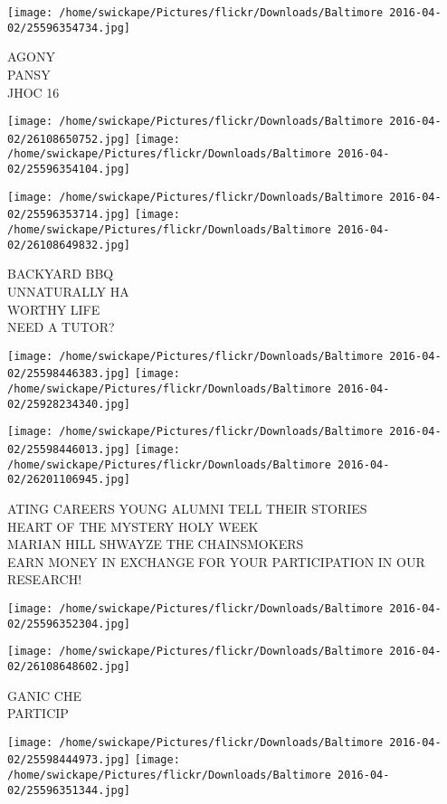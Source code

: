 \documentclass[10pt,letterpaper]{article}
\begin{document}
\vspace{0.25in}
\texttt{[image: /home/swickape/Pictures/flickr/Downloads/Baltimore 2016-04-02/25596354734.jpg]}

AGONY\\
PANSY\\
JHOC 16
\pagebreak

\texttt{[image: /home/swickape/Pictures/flickr/Downloads/Baltimore 2016-04-02/26108650752.jpg]}
\texttt{[image: /home/swickape/Pictures/flickr/Downloads/Baltimore 2016-04-02/25596354104.jpg]}

\texttt{[image: /home/swickape/Pictures/flickr/Downloads/Baltimore 2016-04-02/25596353714.jpg]}
\texttt{[image: /home/swickape/Pictures/flickr/Downloads/Baltimore 2016-04-02/26108649832.jpg]}

BACKYARD BBQ\\
UNNATURALLY HA\\
WORTHY LIFE\\
NEED A TUTOR?
\pagebreak

\texttt{[image: /home/swickape/Pictures/flickr/Downloads/Baltimore 2016-04-02/25598446383.jpg]}
\texttt{[image: /home/swickape/Pictures/flickr/Downloads/Baltimore 2016-04-02/25928234340.jpg]}

\texttt{[image: /home/swickape/Pictures/flickr/Downloads/Baltimore 2016-04-02/25598446013.jpg]}
\texttt{[image: /home/swickape/Pictures/flickr/Downloads/Baltimore 2016-04-02/26201106945.jpg]}

ATING CAREERS YOUNG ALUMNI TELL THEIR STORIES\\
HEART OF THE MYSTERY HOLY WEEK\\
MARIAN HILL SHWAYZE THE CHAINSMOKERS\\
EARN MONEY IN EXCHANGE FOR YOUR PARTICIPATION IN OUR RESEARCH!
\pagebreak

\texttt{[image: /home/swickape/Pictures/flickr/Downloads/Baltimore 2016-04-02/25596352304.jpg]}

\vspace{0.25in}
\texttt{[image: /home/swickape/Pictures/flickr/Downloads/Baltimore 2016-04-02/26108648602.jpg]}

GANIC CHE\\
PARTICIP
\pagebreak

\texttt{[image: /home/swickape/Pictures/flickr/Downloads/Baltimore 2016-04-02/25598444973.jpg]}
\texttt{[image: /home/swickape/Pictures/flickr/Downloads/Baltimore 2016-04-02/25596351344.jpg]}
\end{document}
